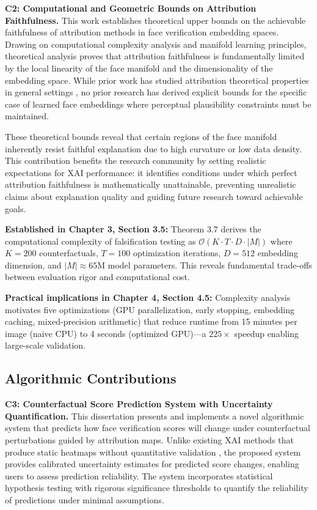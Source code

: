 \vspace{0.5cm}

\textbf{C2: Computational and Geometric Bounds on Attribution Faithfulness.} This work establishes theoretical upper bounds on the achievable faithfulness of attribution methods in face verification embedding spaces. Drawing on computational complexity analysis and manifold learning principles, theoretical analysis proves that attribution faithfulness is fundamentally limited by the local linearity of the face manifold and the dimensionality of the embedding space. While prior work has studied attribution theoretical properties in general settings \cite{Sundararajan2017_IG}, no prior research has derived explicit bounds for the specific case of learned face embeddings where perceptual plausibility constraints must be maintained.

These theoretical bounds reveal that certain regions of the face manifold inherently resist faithful explanation due to high curvature or low data density. This contribution benefits the research community by setting realistic expectations for XAI performance: it identifies conditions under which perfect attribution faithfulness is mathematically unattainable, preventing unrealistic claims about explanation quality and guiding future research toward achievable goals.

\vspace{0.3cm}
\noindent\textbf{Established in Chapter 3, Section 3.5:} Theorem 3.7 derives the computational complexity of falsification testing as $\mathcal{O}(K \cdot T \cdot D \cdot |M|)$ where $K=200$ counterfactuals, $T=100$ optimization iterations, $D=512$ embedding dimension, and $|M|\approx 65$M model parameters. This reveals fundamental trade-offs between evaluation rigor and computational cost.

\vspace{0.3cm}
\noindent\textbf{Practical implications in Chapter 4, Section 4.5:} Complexity analysis motivates five optimizations (GPU parallelization, early stopping, embedding caching, mixed-precision arithmetic) that reduce runtime from 15 minutes per image (naive CPU) to 4 seconds (optimized GPU)---a $225\times$ speedup enabling large-scale validation.

\subsection{Algorithmic Contributions}

\textbf{C3: Counterfactual Score Prediction System with Uncertainty Quantification.} This dissertation presents and implements a novel algorithmic system that predicts how face verification scores will change under counterfactual perturbations guided by attribution maps. Unlike existing XAI methods that produce static heatmaps without quantitative validation \cite{selvaraju2019gradcam,lundberg2017unified}, the proposed system provides calibrated uncertainty estimates for predicted score changes, enabling users to assess prediction reliability. The system incorporates statistical hypothesis testing with rigorous significance thresholds to quantify the reliability of predictions under minimal assumptions.

